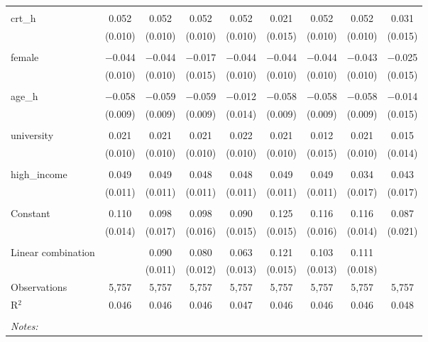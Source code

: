 \begin{table}[!htbp]
\begin{tabular}{@{\extracolsep{5pt}}lcccccccc}
  & & & & & & & & \\ 
 crt\_h & 0.052 & 0.052 & 0.052 & 0.052 & 0.021 & 0.052 & 0.052 & 0.031 \\ 
  & (0.010) & (0.010) & (0.010) & (0.010) & (0.015) & (0.010) & (0.010) & (0.015) \\ 
  & & & & & & & & \\ 
 female & $-$0.044 & $-$0.044 & $-$0.017 & $-$0.044 & $-$0.044 & $-$0.044 & $-$0.043 & $-$0.025 \\ 
  & (0.010) & (0.010) & (0.015) & (0.010) & (0.010) & (0.010) & (0.010) & (0.015) \\ 
  & & & & & & & & \\ 
 age\_h & $-$0.058 & $-$0.059 & $-$0.059 & $-$0.012 & $-$0.058 & $-$0.058 & $-$0.058 & $-$0.014 \\ 
  & (0.009) & (0.009) & (0.009) & (0.014) & (0.009) & (0.009) & (0.009) & (0.015) \\ 
  & & & & & & & & \\ 
 university & 0.021 & 0.021 & 0.021 & 0.022 & 0.021 & 0.012 & 0.021 & 0.015 \\ 
  & (0.010) & (0.010) & (0.010) & (0.010) & (0.010) & (0.015) & (0.010) & (0.014) \\ 
  & & & & & & & & \\ 
 high\_income & 0.049 & 0.049 & 0.048 & 0.048 & 0.049 & 0.049 & 0.034 & 0.043 \\ 
  & (0.011) & (0.011) & (0.011) & (0.011) & (0.011) & (0.011) & (0.017) & (0.017) \\ 
  & & & & & & & & \\ 
 Constant & 0.110 & 0.098 & 0.098 & 0.090 & 0.125 & 0.116 & 0.116 & 0.087 \\ 
  & (0.014) & (0.017) & (0.016) & (0.015) & (0.015) & (0.016) & (0.014) & (0.021) \\ 
  & & & & & & & & \\ 
Linear combination &   & 0.090 & 0.080 & 0.063 & 0.121 & 0.103 & 0.111 &  \\ 
 &  & (0.011) & (0.012) & (0.013) & (0.015) & (0.013) & (0.018) &  \\ 
Observations & 5,757 & 5,757 & 5,757 & 5,757 & 5,757 & 5,757 & 5,757 & 5,757 \\ 
R$^{2}$ & 0.046 & 0.046 & 0.046 & 0.047 & 0.046 & 0.046 & 0.046 & 0.048 \\ 
\hline \\[-1.8ex] 
\textit{Notes:} & \multicolumn{8}{l}{} \\ 
\end{tabular} 
\end{table} 
